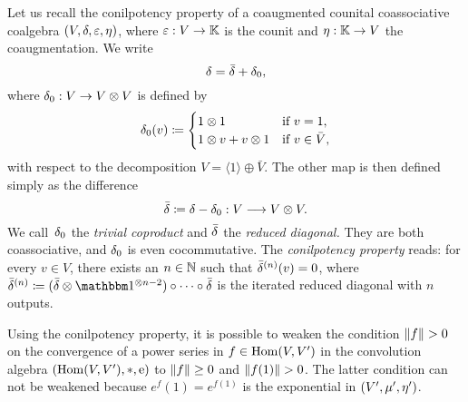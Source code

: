 \documentclass[\MainFolder/Text.tex]{subfiles}
\begin{document}
Let us recall the conilpotency property of a coaugmented counital coassociative coalgebra $(V,\delta,\varepsilon,\eta)$, where $\varepsilon: V \rightarrow \mathbb{K}$ is the counit and $\eta: \mathbb{K}\rightarrow V$ the coaugmentation. We write
\[ \delta =\bar{\delta}+ \delta_0, \]
where $\delta_0: V \rightarrow V\otimes V$ is defined by
\begin{equation}\label{Eq:CoProdOne}
\delta_0(v) \coloneqq \begin{cases} 1 \otimes 1 & \text{if }v=1, \\
1\otimes v + v\otimes 1 & \text{if }v\in \bar{V},\end{cases}
\end{equation}
with respect to the decomposition $V = \langle 1 \rangle \oplus \bar{V}$. The other map is then defined simply as the difference 
\[ \bar{\delta} \coloneqq \delta - \delta_0: V \longrightarrow V\otimes V. \]
We call~$\delta_0$ the \emph{trivial coproduct} and $\bar{\delta}$ the \emph{reduced diagonal.} They are both coassociative, and $\delta_0$ is even cocommutative. The \emph{conilpotency property} reads: for every $v\in V$, there exists an $n\in \mathbb{N}$ such that $\bar{\delta}^{(n)}(v) = 0$, where $\bar{\MVCoProd}^{(n)}\coloneqq(\bar{\MVCoProd}\otimes\Id^{\otimes n-2})\circ \dotsb\circ\bar{\MVCoProd}$ is the iterated reduced diagonal with $n$ outputs.

Using the conilpotency property, it is possible to weaken the condition $\Norm{f}>0$ on the convergence of a power series in $f\in\mathrm{Hom}(V,V')$ in the convolution algebra $(\mathrm{Hom}(V,V'),*,\mathrm{e})$ to $\| f \|\ge 0$ and $\Norm{f(1)}>0$. The latter condition can not be weakened because $e^f(1) = e^{f(1)}$ is the exponential in $(V',\mu',\eta')$.
\end{document}
